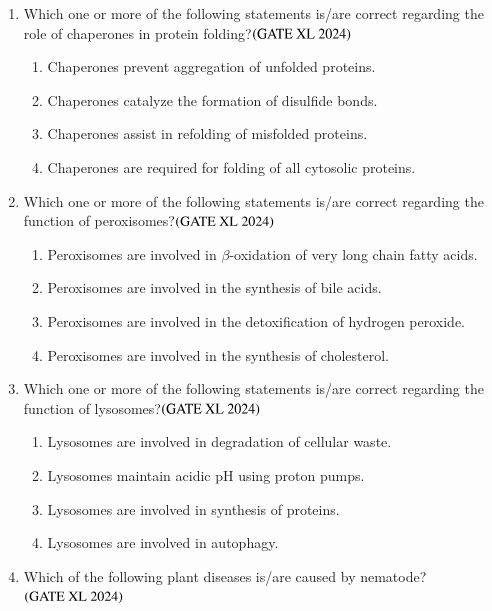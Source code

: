 \documentclass[journal]{IEEEtran}
\begin{document}
\begin{enumerate}
    \item Which one or more of the following statements is/are correct regarding the role of chaperones in protein folding?\hfill $\left(\text{GATE XL 2024}\right)$
    \begin{enumerate}
        \item Chaperones prevent aggregation of unfolded proteins.
        \item Chaperones catalyze the formation of disulfide bonds.
        \item Chaperones assist in refolding of misfolded proteins.
        \item Chaperones are required for folding of all cytosolic proteins.
    \end{enumerate}

    \item Which one or more of the following statements is/are correct regarding the function of peroxisomes?\hfill $\left(\text{GATE XL 2024}\right)$
    \begin{enumerate}
        \item Peroxisomes are involved in $\beta$-oxidation of very long chain fatty acids.
        \item Peroxisomes are involved in the synthesis of bile acids.
        \item Peroxisomes are involved in the detoxification of hydrogen peroxide.
        \item Peroxisomes are involved in the synthesis of cholesterol.
    \end{enumerate}

    \item Which one or more of the following statements is/are correct regarding the function of lysosomes?\hfill $\left(\text{GATE XL 2024}\right)$
    \begin{enumerate}
        \item Lysosomes are involved in degradation of cellular waste.
        \item Lysosomes maintain acidic pH using proton pumps.
        \item Lysosomes are involved in synthesis of proteins.
        \item Lysosomes are involved in autophagy.
    \end{enumerate}

    \item Which of the following plant diseases is/are caused by nematode?\hfill $\left(\text{GATE XL 2024}\right)$
    \begin{enumerate}
    \end{enumerate}


\end{enumerate}
\end{document}
